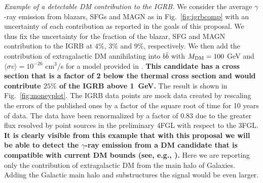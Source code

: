 \documentclass[12 pt]{article}
\begin{document}
{\it Example of a detectable DM contribution to the IGRB.}
We consider the average $\gamma$-ray emission from blazars, SFGs and MAGN as in Fig.~\ref{fig:igrbcomp} with an uncertainty of each contribution as reported in the goals of this proposal. We thus fix the uncertainty for the fraction of the blazar, SFG and MAGN contribution to the IGRB at $4\%$, $3\%$ and $9\%$, respectively.
We then add the contribution of extragalactic DM annihilating into $b\bar{b}$ with $M_{\rm{DM}}=100$ GeV and $\langle \sigma v \rangle = 10^{-26}$ cm$^3$/s for a model provided in \cite{Cirelli:2010xx}. 
{\bf This candidate has a cross section that is a factor of 2 below the thermal cross section and would contribute $25\%$ of the IGRB above 1~GeV.}
The result is shown in Fig.~\ref{fig:moneyplot}. The IGRB data points are mock data created by rescaling the errors of the published ones \cite{Ackermann:2014usa} by a factor of the square root of time for 10 years of data. The data have been renormalized by a factor of 0.83 due to the greater flux resolved by point sources in the preliminary 4FGL with respect to the 3FGL.
{\bf It is clearly visible from this example that with this proposal we will be able to detect the $\gamma$-ray emission from a DM candidate that is compatible with current DM bounds (see, e.g., \cite{Fermi-LAT:2016uux}).} Here we are reporting only the contribution of extragalactic DM from the main halo of Galaxies. Adding the Galactic main halo and substructures the signal would be even larger.



\end{document}
